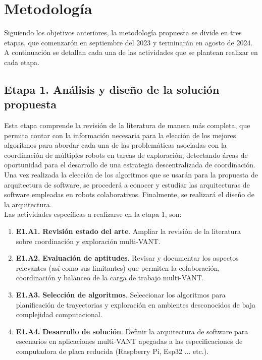 \documentclass[sigconf]{acmart}
\begin{document}
\section{Metodología}

Siguiendo los objetivos anteriores, la metodolog\'{i}a propuesta se divide en tres etapas, que comenzarón en septiembre del 2023 y terminarán en agosto de 2024. A continuaci\'{o}n se detallan cada una de las actividades que se plantean realizar en cada etapa.

\subsection*{Etapa 1. An\'{a}lisis y dise\~{n}o de la soluci\'{o}n propuesta}

Esta etapa comprende la revisi\'{o}n de la literatura de manera m\'{a}s completa, que permita contar con la informaci\'{o}n necesaria para la elecci\'{o}n de los mejores algoritmos para abordar cada una de las problem\'{a}ticas asociadas con la coordinaci\'{o}n de múltiples robots en tareas de exploración, detectando áreas de oportunidad para el desarrollo de una estrategia descentralizada de coordinación. Una vez realizada la elecci\'{o}n de los algoritmos que se usar\'{a}n para la propuesta de arquitectura de software, se proceder\'{a} a conocer y estudiar las arquitecturas de software empleadas en robots colaborativos. Finalmente, se realizar\'{a} el dise\~{n}o de la arquitectura.\\

Las actividades espec\'{i}ficas a realizarse en la etapa 1, son:
  
  \begin{enumerate}
  \item[] \textbf{E1.A1.} \textbf{Revisi\'{o}n estado del arte}. Ampliar la revisi\'{o}n de la literatura sobre coordinaci\'{o}n y exploraci\'{o}n multi-VANT.
  \item[] \textbf{E1.A2.} \textbf{Evaluaci\'{o}n de aptitudes}. Revisar y documentar los aspectos relevantes (así como sus limitantes) que permiten la colaboraci\'{o}n, coordinaci\'{o}n y balanceo de la carga de trabajo multi-VANT.
  \item[] \textbf{E1.A3.} \textbf{Selecci\'{o}n de algoritmos}. Seleccionar los algoritmos para planificaci\'{o}n de trayectorias y exploraci\'{o}n en ambientes desconocidos de baja complejidad computacional.
  \item[] \textbf{E1.A4.} \textbf{Desarrollo de soluci\'{o}n}. Definir la arquitectura de software para escenarios en aplicaciones multi-VANT apegadas a las especificaciones de computadora de placa reducida (Raspberry Pi, Esp32 ... etc.).
  
  \end{enumerate}
  
\end{document}
